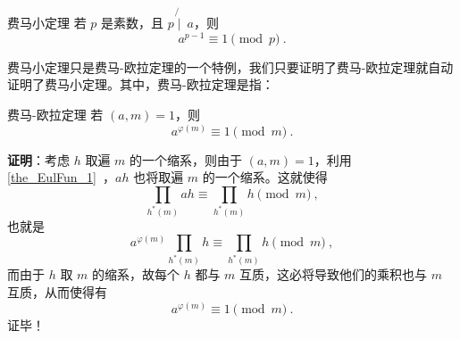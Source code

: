 

\begin{theorem}{费马小定理}
若 $p$ 是素数，且 $p \not{\mid}~ a$，则
\begin{equation}
a^{p-1} \equiv 1 \pmod p ~.
\end{equation}
\end{theorem}

费马小定理只是费马-欧拉定理的一个特例，我们只要证明了费马-欧拉定理就自动证明了费马小定理。其中，费马-欧拉定理是指：
\begin{theorem}{费马-欧拉定理}
若 $(a, m) = 1$，则
\begin{equation}
a^{\varphi(m)} \equiv 1 \pmod m ~.
\end{equation}
\end{theorem}
\textbf{证明}：考虑 $h$ 取遍 $m$ 的一个缩系，则由于 $(a, m) = 1$，利用\autoref{the_EulFun_1}~，$ah$ 也将取遍 $m$ 的一个缩系。这就使得
\begin{equation}
\prod_{h^*(m)}{a h} \equiv \prod _{h^*(m)}h \pmod m ~,
\end{equation}
也就是
\begin{equation}
a^{\varphi(m)} \prod_{h^*(m)} h \equiv \prod_{h^*(m)} h \pmod m ~,
\end{equation}
而由于 $h$ 取 $m$ 的缩系，故每个 $h$ 都与 $m$ 互质，这必将导致他们的乘积也与 $m$ 互质，从而使得有
\begin{equation}
a^{\varphi(m)} \equiv 1 \pmod m ~.
\end{equation}
证毕！


